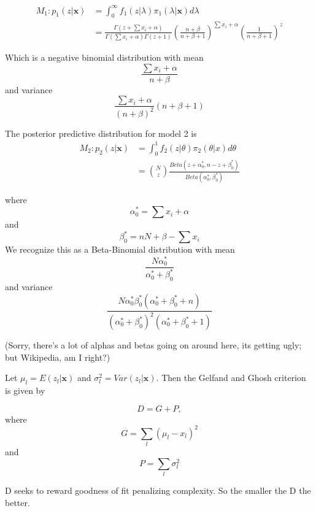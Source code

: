 \documentclass[a4paper, 9pt]{article}
\newcommand{\parenth}[1]{\left(#1\right)}
\newcommand{\xbold}{ \pmb{x} }
\begin{document}
\begin{enumerate}
\begin{align*}
    M_1: p_1(z|\xbold) &= \int_{0}^\infty f_1(z|\lambda) \pi_1(\lambda|\xbold)d\lambda\\
    & = \frac{\Gamma(z + \sum x_i + \alpha)}{\Gamma(\sum x_i + \alpha) \Gamma(z+1)}\parenth{\frac{n+\beta}{n+\beta + 1}}^{\sum x_i + \alpha} \parenth{\frac{1}{n + \beta + 1}}^z
\end{align*}

Which is a negative binomial distribution with mean
$$ \frac{\sum x_i + \alpha}{n+\beta}$$
and variance
$$\frac{\sum x_i + \alpha}{(n+\beta)^2}(n+\beta+1) $$

The posterior predictive distribution for model 2 is
\begin{align*}
    M_2: p_2(z|\xbold) & = \int_0^1 f_2(z|\theta)\pi_2(\theta|x)d\theta\\
    &= {N\choose{z}} \frac{Beta(z + \alpha_0^*, n -z + \beta_0^*)}{Beta(\alpha_0^*, \beta_0^*)}
\end{align*}

where $$\alpha_0^* = \sum x_i + \alpha$$ 
and 
$$\beta_0^* = nN + \beta - \sum x_i$$
We recognize this as a Beta-Binomial distribution with mean
$$\frac{N\alpha_0^*}{\alpha_0^* + \beta_0^*} $$
and variance
$$\frac{N\alpha_0^* \beta_0^* (\alpha_0^* + \beta_0^* + n)}{(\alpha_0^* + \beta_0^*)^2(\alpha_0^* + \beta_0^* + 1)}$$

(Sorry, there's a lot of alphas and betas going on around here, its getting ugly; but Wikipedia, am I right?)


Let $\mu_l = E(z_l| \pmb{x})$ and $\sigma^2_l = Var(z_l| \pmb{x})$. Then the Gelfand and Ghosh criterion is given by

$$D = G + P,$$ 
where $$G=\displaystyle \sum_l (\mu_l - x_l)^2$$
and 
$$P = \displaystyle \sum_l \sigma^2_l$$

D seeks to reward goodness of fit penalizing complexity. So the smaller the D the better.








\end{enumerate}
\end{document}

